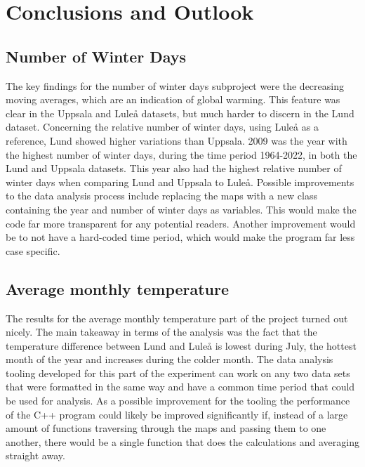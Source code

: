 \documentclass[aps,prl,groupedaddress,twocolumn]{revtex4-1}
\begin{document}
\section{Conclusions and Outlook}

\subsection{Number of Winter Days}
The key findings for the number of winter days subproject were the decreasing moving averages, which are an indication of global warming. This feature was clear in the Uppsala and Luleå datasets, but much harder to discern in the Lund dataset. Concerning the relative number of winter days, using Luleå as a reference, Lund showed higher variations than Uppsala. 2009 was the year with the highest number of winter days, during the time period 1964-2022, in both the Lund and Uppsala datasets. This year also had the highest relative number of winter days when comparing Lund and Uppsala to Luleå. Possible improvements to the data analysis process include replacing the maps with a new class containing the year and number of winter days as variables. This would make the code far more transparent for any potential readers. Another improvement would be to not have a hard-coded time period, which would make the program far less case specific.

\subsection{Average monthly temperature}
The results for the average monthly temperature part of the project turned out nicely. The main takeaway in terms of the analysis was the fact that the temperature difference between Lund and Luleå is lowest during July, the hottest month of the year and increases during the colder month. The data analysis tooling developed for this part of the experiment can work on any two data sets that were formatted in the same way and have a common time period that could be used for analysis. As a possible improvement for the tooling the performance of the C++ program could likely be improved significantly if, instead of a large amount of functions traversing through the maps and passing them to one another, there would be a single function that does the calculations and averaging straight away.
\end{document}
